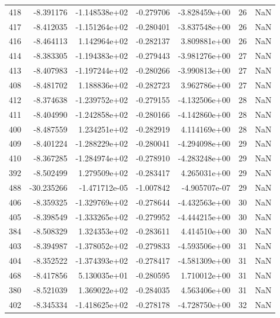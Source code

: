 \begin{tabular}{rrrrrrr}
 418 &  -8.391176 & -1.148538e+02 & -0.279706 & -3.828459e+00 &          26 & NaN \\
 417 &  -8.412035 & -1.151264e+02 & -0.280401 & -3.837548e+00 &          26 & NaN \\
 416 &  -8.464113 &  1.142964e+02 & -0.282137 &  3.809881e+00 &          26 & NaN \\
 414 &  -8.383305 & -1.194383e+02 & -0.279443 & -3.981276e+00 &          27 & NaN \\
 413 &  -8.407983 & -1.197244e+02 & -0.280266 & -3.990813e+00 &          27 & NaN \\
 408 &  -8.481702 &  1.188836e+02 & -0.282723 &  3.962786e+00 &          27 & NaN \\
 412 &  -8.374638 & -1.239752e+02 & -0.279155 & -4.132506e+00 &          28 & NaN \\
 411 &  -8.404990 & -1.242858e+02 & -0.280166 & -4.142860e+00 &          28 & NaN \\
 400 &  -8.487559 &  1.234251e+02 & -0.282919 &  4.114169e+00 &          28 & NaN \\
 409 &  -8.401224 & -1.288229e+02 & -0.280041 & -4.294098e+00 &          29 & NaN \\
 410 &  -8.367285 & -1.284974e+02 & -0.278910 & -4.283248e+00 &          29 & NaN \\
 392 &  -8.502499 &  1.279509e+02 & -0.283417 &  4.265031e+00 &          29 & NaN \\
 488 & -30.235266 & -1.471712e-05 & -1.007842 & -4.905707e-07 &          29 & NaN \\
 406 &  -8.359325 & -1.329769e+02 & -0.278644 & -4.432563e+00 &          30 & NaN \\
 405 &  -8.398549 & -1.333265e+02 & -0.279952 & -4.444215e+00 &          30 & NaN \\
 384 &  -8.508329 &  1.324353e+02 & -0.283611 &  4.414510e+00 &          30 & NaN \\
 403 &  -8.394987 & -1.378052e+02 & -0.279833 & -4.593506e+00 &          31 & NaN \\
 404 &  -8.352522 & -1.374393e+02 & -0.278417 & -4.581309e+00 &          31 & NaN \\
 468 &  -8.417856 &  5.130035e+01 & -0.280595 &  1.710012e+00 &          31 & NaN \\
 380 &  -8.521039 &  1.369022e+02 & -0.284035 &  4.563406e+00 &          31 & NaN \\
 402 &  -8.345334 & -1.418625e+02 & -0.278178 & -4.728750e+00 &          32 & NaN \\

\end{tabular}
